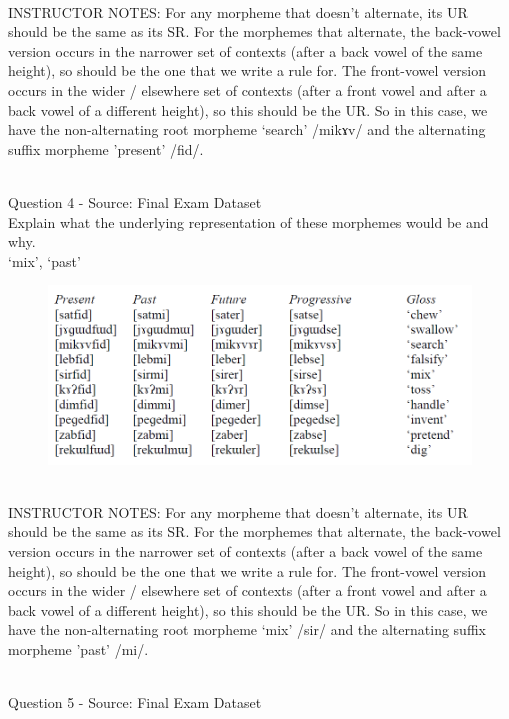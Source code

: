 \documentclass[12pt]{article}
\begin{document}
~\\
INSTRUCTOR NOTES: For any morpheme that doesn’t alternate, its UR should be the same as its SR.  For the morphemes that alternate, the back-vowel version occurs in the narrower set of contexts (after a back vowel of the same height), so should be the one that we write a rule for. The front-vowel version occurs in the wider / elsewhere set of contexts (after a front vowel and after a back vowel of a different height), so this should be the UR. So in this case, we have the non-alternating root morpheme ‘search’ /mikɤv/ and the alternating suffix morpheme 'present' /fid/.


~\\

{\large Question 4} - Source: Final Exam Dataset\\

Explain what the underlying representation of these morphemes would be and why.\\

`mix', `past'

\begin{figure}[H]
\includegraphics{../images/final_dataset.png}
\end{figure}

~\\
INSTRUCTOR NOTES: For any morpheme that doesn’t alternate, its UR should be the same as its SR.  For the morphemes that alternate, the back-vowel version occurs in the narrower set of contexts (after a back vowel of the same height), so should be the one that we write a rule for. The front-vowel version occurs in the wider / elsewhere set of contexts (after a front vowel and after a back vowel of a different height), so this should be the UR. So in this case, we have the non-alternating root morpheme ‘mix’ /sir/ and the alternating suffix morpheme 'past' /mi/.


~\\

{\large Question 5} - Source: Final Exam Dataset\\
\end{document}
